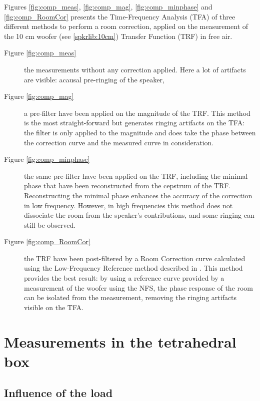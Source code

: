 \documentclass{report}
\begin{document}

Figures \ref{fig:comp_meas}, \ref{fig:comp_mag}, \ref{fig:comp_minphase} and \ref{fig:comp_RoomCor} presents the Time-Frequency Analysis (TFA) of three different methods to perform a room correction, applied on the measurement of the 10 cm woofer (see \ref{spkrlib:10cm}) Transfer Function (TRF) in free air.
\begin{description}
\item[Figure \ref{fig:comp_meas}] the measurements without any correction applied. Here a lot of artifacts are visible: acausal pre-ringing of the speaker, 
\item[Figure \ref{fig:comp_mag}] a pre-filter have been applied on the magnitude of the TRF. This method is the most straight-forward but generates ringing artifacts on the TFA: the filter is only applied to the magnitude and does take the phase between the correction curve and the measured curve in consideration. 
\item[Figure \ref{fig:comp_minphase}] the same pre-filter have been applied on the TRF, including the minimal phase that have been reconstructed from the cepstrum of the TRF. Reconstructing the minimal phase enhances the accuracy of the correction in low frequency. However, in high frequencies this method does not dissociate the room from the speaker's contributions, and some ringing can still be observed.
\item[Figure \ref{fig:comp_RoomCor}] the TRF have been post-filtered by a Room Correction curve calculated using the Low-Frequency Reference method described in \citep[][sect.~4]{aeswb}. This method provides the best result: by using a reference curve provided by a measurement of the woofer using the NFS, the phase response of the room can be isolated from the measurement, removing the ringing artifacts visible on the TFA. 
\end{description}


\section{Measurements in the tetrahedral box}

\subsection{Influence of the load}
\end{document}
